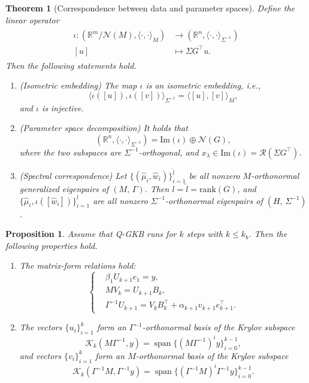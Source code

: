 \documentclass[10pt,a4paper]{amsart}
\newtheorem{theorem}{Theorem}
\newtheorem{proposition}{Proposition}
\begin{document}
\begin{theorem}[Correspondence between data and parameter spaces]\label{thm:isom}
  Define the linear operator 
  \begin{align}\label{isom}
    \begin{split}
      \iota: (\mathbb R^m/\mathcal N(M),\langle\cdot,\cdot\rangle_M)
          &\longrightarrow (\mathbb R^n,\langle\cdot,\cdot\rangle_{\Sigma^{-1}}) \\
      [u] &\longmapsto \Sigma G^{\top}u.
    \end{split}
  \end{align} 
  Then the following statements hold.
\begin{enumerate}
\item[(a)] (Isometric embedding)
The map $\iota$ is an isometric embedding, i.e.,
\[ \langle \iota([u]),\iota([v])\rangle_{\Sigma^{-1}}
=\langle [u],[v]\rangle_M,
\]
and $\iota$ is injective.
\item[(b)] (Parameter space decomposition)
It holds that 
\begin{equation*}
  (\mathbb R^n,\langle\cdot,\cdot\rangle_{\Sigma^{-1}})
  = \mathrm{Im}(\iota) \oplus \mathcal{N}(G) ,
\end{equation*}
where the two subspaces are $\Sigma^{-1}$-orthogonal, and $x_{\lambda}\in \mathrm{Im}(\iota)=\mathcal{R}(\Sigma G^\top)$.
\item[(c)] (Spectral correspondence)
Let $\{(\hat\mu_i,\hat w_i)\}_{i=1}^{\hat{l}}$ be all nonzero $M$-orthonormal generalized eigenpairs of $(M,\,\Gamma)$. Then $l=\hat{l}=\mathrm{rank}(G)$, and $\{\hat\mu_i,\iota([\hat w_i])\}_{i=1}^{l}$ are all nonzero $\Sigma^{-1}$-orthonormal eigenpairs of $(H,\,\Sigma^{-1})$.
\end{enumerate}
\end{theorem}

\begin{proposition}\label{thm:qsggkb-properties}
Assume that Q-GKB runs for $k$ steps with $k\leq k_b$. Then the following properties hold.
\begin{enumerate}
\item[(a)] The matrix-form relations hold:
\begin{equation}\label{eq:bidiag-relations}
\left\{
\begin{aligned}
& \beta_1 U_{k+1} e_1 = y, \\
& M V_{k} = U_{k+1} B_k, \\
& \Gamma^{-1} U_{k+1} = V_{k} B_k^\top + \alpha_{k+1} v_{k+1} e_{k+1}^\top .
\end{aligned}
\right.
\end{equation}
\item[(b)] The vectors $\{u_i\}_{i=1}^k$ form an $\Gamma^{-1}$-orthonormal basis of the Krylov subspace
\[\mathcal K_k(M\Gamma^{-1},y) = \operatorname{span}\{(M\Gamma^{-1})^i y\}_{i=0}^{k-1},\]
and vectors $\{v_i\}_{i=1}^k$ form an $M$-orthonormal basis of the Krylov subspace
\[\mathcal K_k(\Gamma^{-1}M,\Gamma^{-1}y) = \operatorname{span}\{(\Gamma^{-1}M)^i\Gamma^{-1}y\}_{i=0}^{k-1}.\]
\end{enumerate}
\end{proposition}
\end{document}

